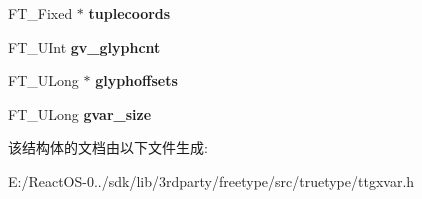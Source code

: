\begin{DoxyCompactItemize}
\mbox{\label{struct_g_x___blend_rec___a2cb5428f1fa52a53c760624fb2703d1f}} 
F\+T\+\_\+\+Fixed $\ast$ {\bfseries tuplecoords}
\item 
\mbox{\label{struct_g_x___blend_rec___a12334445cd9e4c22742e4f00d65f2306}} 
F\+T\+\_\+\+U\+Int {\bfseries gv\+\_\+glyphcnt}
\item 
\mbox{\label{struct_g_x___blend_rec___ad2fd33dafedc71921834d2f06296d8f7}} 
F\+T\+\_\+\+U\+Long $\ast$ {\bfseries glyphoffsets}
\item 
\mbox{\label{struct_g_x___blend_rec___a0ecd9805b3b803bc39fe9afda6b821e6}} 
F\+T\+\_\+\+U\+Long {\bfseries gvar\+\_\+size}
\end{DoxyCompactItemize}


该结构体的文档由以下文件生成\+:\begin{DoxyCompactItemize}
\item 
E\+:/\+React\+O\+S-\/0../sdk/lib/3rdparty/freetype/src/truetype/ttgxvar.\+h\end{DoxyCompactItemize}
